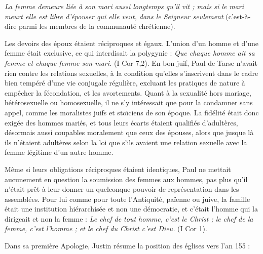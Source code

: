 \begin{displayquote}[I Cor 7,39]
\emph{La femme demeure liée à son mari aussi longtemps qu'il vit ; mais si le mari meurt elle est libre d'épouser qui elle veut, dans le Seigneur seulement} (c'est-à-dire parmi les membres de la communauté chrétienne).
\end{displayquote}
 
 Les devoirs des époux étaient réciproques et égaux. L'union d'un homme et d'une femme était exclusive, ce qui interdisait la polygynie : \emph{Que chaque homme ait sa femme et chaque femme son mari.} (I Cor 7,2). En bon juif, Paul de Tarse n'avait rien contre les relations sexuelles, à la condition qu'elles s'inscrivent dans le cadre bien tempéré d'une vie conjugale régulière, excluant les pratiques de nature à empêcher la fécondation, et les avortements. Quant à la sexualité hors mariage, hétérosexuelle ou homosexuelle, il ne s'y intéressait que pour la condamner sans appel, comme les moralistes juifs et stoïciens de son époque. La fidélité était donc exigée des hommes mariés, et tous leurs écarts étaient qualifiés d'adultères, désormais aussi coupables moralement que ceux des épouses, alors que jusque là ils n'étaient adultères selon la loi que s'ils avaient une relation sexuelle avec la femme légitime d'un autre homme. 
 
 Même si leurs obligations réciproques étaient identiques, Paul ne mettait aucunement en question la soumission des femmes aux hommes, pas plus qu'il n'était prêt à leur donner un quelconque pouvoir de représentation dans les assemblées. Pour lui comme pour toute l'Antiquité, païenne ou juive, la famille était une institution hiérarchisée et non une démocratie, et c'était l'homme qui la dirigeait et non la femme : \emph{Le chef de tout homme, c'est le Christ ; le chef de la femme, c'est l'homme ; et le chef du Christ c'est Dieu.} (I Cor 1).


Dans sa première Apologie, Justin résume la position des églises vers l'an 155 :

